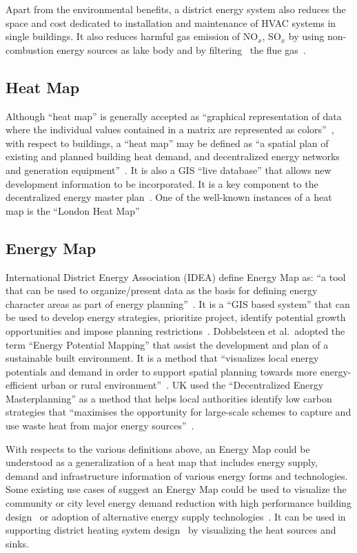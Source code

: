 Apart from the environmental benefits, a district energy system also
reduces the space and cost dedicated to installation and maintenance
of HVAC systems in single buildings. It also reduces harmful gas
emission of NO$_x$, SO$_x$ by using non-combustion energy sources as
lake body and by filtering~\cite{IDEA2012} the flue
gas~\cite{veolia2014}.

\subsection{Heat Map}
Although ``heat map'' is generally accepted as ``graphical
representation of data where the individual values contained in a
matrix are represented as colors''~\cite{HeatmapWiki}, with respect to
buildings, a ``heat map'' may be defined as ``a spatial plan of
existing and planned building heat demand, and decentralized energy
networks and generation equipment''~\cite{decentralHeatMap2011}. It is
also a GIS ``live database'' that allows new development information
to be incorporated. It is a key component to the decentralized energy
master plan~\cite{decentralHeatMap2011}. One of the well-known
instances of a heat map is the ``London Heat
Map''~\cite{londonHeatMap}

\subsection{Energy Map}
International District Energy Association (IDEA) define Energy Map as:
``a tool that can be used to organize/present data as the basis for
defining energy character areas as part of energy
planning''~\cite{IDEA2012}. It is a ``GIS based system'' that can be
used to develop energy strategies, prioritize project, identify
potential growth opportunities and impose planning
restrictions~\cite{IDEA2012}. Dobbelsteen et al.\ adopted the term
``Energy Potential Mapping'' that assist the development and plan of a
sustainable built environment. It is a method that ``visualizes local
energy potentials and demand in order to support spatial planning
towards more energy-efficient urban or rural
environment''~\cite{Dobbelsteen2013}. UK used the ``Decentralized
Energy Masterplanning'' as a method that helps local authorities
identify low carbon strategies that ``maximises the opportunity for
large-scale schemes to capture and use waste heat from major energy
sources''~\cite{decentralHeatMap2011}.

With respects to the various definitions above, an Energy Map could be
understood as a generalization of a heat map that includes energy
supply, demand and infrastructure information of various energy forms
and technologies. Some existing use cases of suggest an Energy Map
could be used to visualize the community or city level energy demand
reduction with high performance building design~\cite{aacip2009} or
adoption of alternative energy supply
technologies~\cite{aacip2009}. It can be used in supporting district
heating system design~\cite{decentralHeatMap2011, Finney2012165} by
visualizing the heat sources and sinks.


